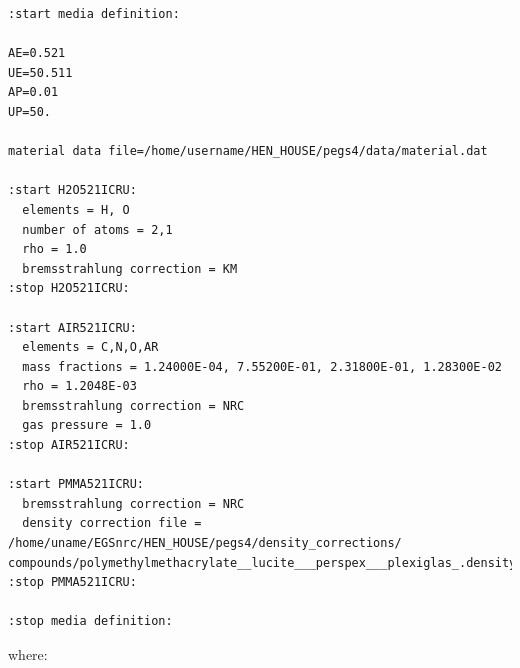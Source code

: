 \documentclass[12pt,twoside]{article}  %
\begin{document}
\begin{verbatim}
:start media definition:

AE=0.521
UE=50.511
AP=0.01
UP=50.

material data file=/home/username/HEN_HOUSE/pegs4/data/material.dat

:start H2O521ICRU:
  elements = H, O
  number of atoms = 2,1
  rho = 1.0
  bremsstrahlung correction = KM
:stop H2O521ICRU:

:start AIR521ICRU:
  elements = C,N,O,AR
  mass fractions = 1.24000E-04, 7.55200E-01, 2.31800E-01, 1.28300E-02
  rho = 1.2048E-03
  bremsstrahlung correction = NRC
  gas pressure = 1.0
:stop AIR521ICRU:

:start PMMA521ICRU:
  bremsstrahlung correction = NRC
  density correction file = /home/uname/EGSnrc/HEN_HOUSE/pegs4/density_corrections/
compounds/polymethylmethacrylate__lucite___perspex___plexiglas_.density
:stop PMMA521ICRU:

:stop media definition:
\end{verbatim}
where:
\end{document}
